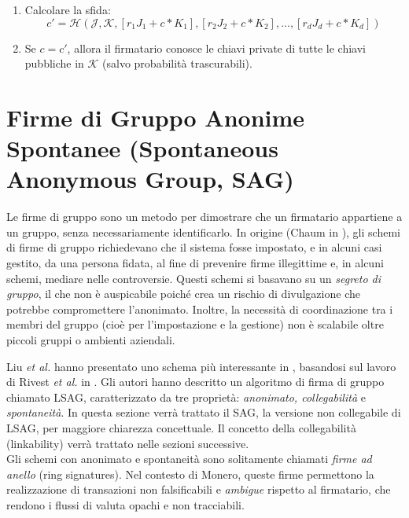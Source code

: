 \begin{enumerate}
	\item Calcolare la sfida:\vspace{.175cm}
	\[c' = \mathcal{H}(\mathcal{J},\mathcal{K},[r_1 J_1 + c*K_1],[r_2 J_2 + c*K_2],...,[r_d J_d + c*K_d])\]
	\item Se $c = c'$, allora il firmatario conosce le chiavi private di tutte le chiavi pubbliche in $\mathcal{K}$ (salvo probabilità trascurabili).
\end{enumerate}



\section{Firme di Gruppo Anonime Spontanee (Spontaneous Anonymous Group, SAG)}
\label{SAG_section}

Le firme di gruppo sono un metodo per dimostrare che un firmatario appartiene a un gruppo, senza necessariamente identificarlo. In origine (Chaum in \cite{Chaum:1991:GS:1754868.1754897}), gli schemi di firme di gruppo richiedevano che il sistema fosse impostato, e in alcuni casi gestito, da una persona fidata, al fine di prevenire firme illegittime e, in alcuni schemi, mediare nelle controversie. Questi schemi si basavano su un {\em segreto di gruppo}, il che non è auspicabile poiché crea un rischio di divulgazione che potrebbe compromettere l'anonimato. Inoltre, la necessità di coordinazione tra i membri del gruppo (cioè per l'impostazione e la gestione) non è scalabile oltre piccoli gruppi o ambienti aziendali.

Liu {\em et al.} hanno presentato uno schema più interessante in \cite{Liu2004}, basandosi sul lavoro di Rivest {\em et al.} in \cite{rivest-leak-secret}. Gli autori hanno descritto un algoritmo di firma di gruppo chiamato LSAG, caratterizzato da tre proprietà: {\em anonimato, collegabilità} e {\em spontaneità}. In questa sezione verrà trattato il SAG, la versione non collegabile di LSAG, per maggiore chiarezza concettuale. Il concetto della collegabilità (linkability) verrà trattato nelle sezioni successive.
\\

Gli schemi con anonimato e spontaneità sono solitamente chiamati \emph{firme ad anello} (ring signatures). Nel contesto di Monero, queste firme permettono la realizzazione di transazioni non falsificabili e \emph{ambigue} rispetto al firmatario, che rendono i flussi di valuta opachi e non tracciabili.


